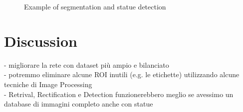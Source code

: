 \documentclass[10pt,twocolumn,letterpaper]{article}
\begin{document}
\begin{figure}
    \centering
    \caption{Example of segmentation and statue detection}
    \label{fig:results2}
\end{figure}


\section{Discussion}

- migliorare la rete con dataset più ampio e bilanciato \\
- potremmo eliminare alcune ROI inutili (e.g. le etichette) utilizzando alcune tecniche di Image Processing \\
- Retrival, Rectification e Detection funzionerebbero meglio se avessimo un database di immagini completo anche con statue \\


{\small


}
\end{document}
